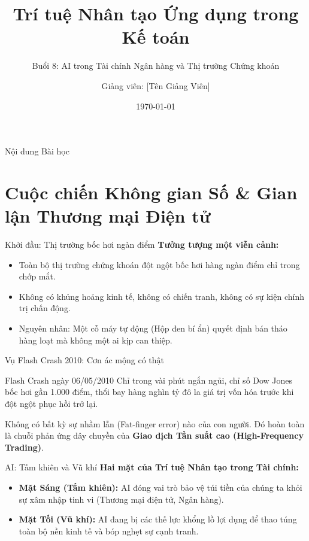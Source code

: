\documentclass[aspectratio=169]{beamer}
\title[TTNT trong Kế toán - Buổi 8]{Trí tuệ Nhân tạo Ứng dụng trong Kế toán}
\subtitle{Buổi 8: AI trong Tài chính Ngân hàng và Thị trường Chứng khoán}
\author{Giảng viên: [Tên Giảng Viên]}
\institute{Đại học Đông Á}
\date{\today}
\begin{document}
\begin{frame}
    \titlepage
\end{frame}

\begin{frame}{Nội dung Bài học}
    \tableofcontents
\end{frame}

\section{Cuộc chiến Không gian Số \& Gian lận Thương mại Điện tử}

\begin{frame}{Khởi đầu: Thị trường bốc hơi ngàn điểm}
    \textbf{Tưởng tượng một viễn cảnh:}
    \begin{itemize}
        \item Toàn bộ thị trường chứng khoán đột ngột bốc hơi hàng ngàn điểm chỉ trong chớp mắt.
        \item Không có khủng hoảng kinh tế, không có chiến tranh, không có sự kiện chính trị chấn động.
        \item Nguyên nhân: Một cỗ máy tự động (Hộp đen bí ẩn) quyết định bán tháo hàng loạt mà không một ai kịp can thiệp.
    \end{itemize}
\end{frame}

\begin{frame}{Vụ Flash Crash 2010: Cơn ác mộng có thật}
    \begin{alertblock}{Flash Crash ngày 06/05/2010}
        Chỉ trong vài phút ngắn ngủi, chỉ số Dow Jones bốc hơi gần 1.000 điểm, thổi bay hàng nghìn tỷ đô la giá trị vốn hóa trước khi đột ngột phục hồi trở lại.
    \end{alertblock}
    Không có bất kỳ sự nhầm lẫn (Fat-finger error) nào của con người. Đó hoàn toàn là chuỗi phản ứng dây chuyền của \textbf{Giao dịch Tần suất cao (High-Frequency Trading)}.
\end{frame}

\begin{frame}{AI: Tấm khiên và Vũ khí}
    \textbf{Hai mặt của Trí tuệ Nhân tạo trong Tài chính:}
    \begin{itemize}
        \item \textbf{Mặt Sáng (Tấm khiên):} AI đóng vai trò bảo vệ túi tiền của chúng ta khỏi sự xâm nhập tinh vi (Thương mại điện tử, Ngân hàng).
        \item \textbf{Mặt Tối (Vũ khí):} AI đang bị các thế lực khổng lồ lợi dụng để thao túng toàn bộ nền kinh tế và bóp nghẹt sự cạnh tranh.
    \end{itemize}
\end{frame}
\end{document}

